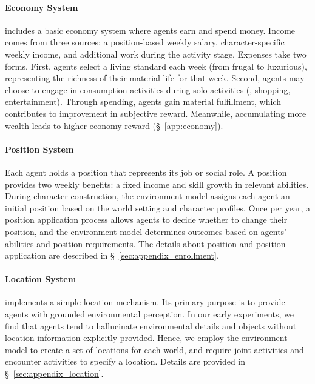 \paragraph{Economy System}
\method includes a basic economy system where agents earn and spend money.
Income comes from three sources: a position-based weekly salary, character-specific weekly income, and additional work during the activity stage.
Expenses take two forms.
First, agents select a living standard each week (from frugal to luxurious), representing the richness of their material life for that week.
Second, agents may choose to engage in consumption activities during solo activities (\eg, shopping, entertainment).
Through spending, agents gain material fulfillment, which contributes to improvement in subjective reward.
Meanwhile, accumulating more wealth leads to higher economy reward (\S~\ref{app:economy}).

\paragraph{Position System}
Each agent holds a position that represents its job or social role.
A position provides two weekly benefits: a fixed income and skill growth in relevant abilities.
During character construction, the environment model assigns each agent an initial position based on the world setting and character profiles.
Once per year, a position application process allows agents to decide whether to change their position, and the environment model determines outcomes based on agents' abilities and position requirements.
The details about position and position application are described in \S~\ref{sec:appendix_enrollment}.

\paragraph{Location System}
\method implements a simple location mechanism.
Its primary purpose is to provide agents with grounded environmental perception.
In our early experiments, we find that agents tend to hallucinate environmental details and objects without location information explicitly provided.
Hence, we employ the environment model to create a set of locations for each world, and require joint activities and encounter activities to specify a location.
Details are provided in \S~\ref{sec:appendix_location}.
